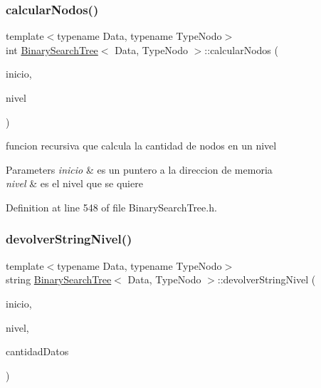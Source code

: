 \mbox{\label{class_binary_search_tree_adb25fc678a13dbaa05ba0c0627eb232e}} 
\subsubsection{\texorpdfstring{calcular\+Nodos()}{calcularNodos()}}
{\footnotesize\ttfamily template$<$typename Data, typename Type\+Nodo$>$ \\
int \hyperlink{class_binary_search_tree}{Binary\+Search\+Tree}$<$ Data, Type\+Nodo $>$\+::calcular\+Nodos (\begin{DoxyParamCaption}\item[{\hyperlink{class_class_node}{Class\+Node}$<$ Data $>$ $\ast$}]{inicio,  }\item[{int}]{nivel }\end{DoxyParamCaption})\hspace{0.3cm}{\ttfamily [inline]}}



funcion recursiva que calcula la cantidad de nodos en un nivel 


\begin{DoxyParams}{Parameters}
{\em inicio} & es un puntero a la direccion de memoria \\
\hline
{\em nivel} & es el nivel que se quiere \\
\hline
\end{DoxyParams}


Definition at line 548 of file Binary\+Search\+Tree.\+h.

\mbox{\label{class_binary_search_tree_a30a79ed298da4d6fe4395dddd53842b8}} 
\subsubsection{\texorpdfstring{devolver\+String\+Nivel()}{devolverStringNivel()}}
{\footnotesize\ttfamily template$<$typename Data, typename Type\+Nodo$>$ \\
string \hyperlink{class_binary_search_tree}{Binary\+Search\+Tree}$<$ Data, Type\+Nodo $>$\+::devolver\+String\+Nivel (\begin{DoxyParamCaption}\item[{\hyperlink{class_class_node}{Class\+Node}$<$ Data $>$ $\ast$}]{inicio,  }\item[{int}]{nivel,  }\item[{int}]{cantidad\+Datos }\end{DoxyParamCaption})\hspace{0.3cm}{\ttfamily [inline]}}



